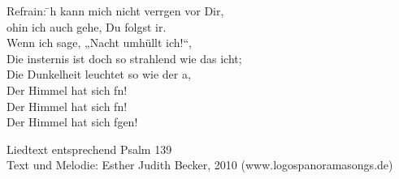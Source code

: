 \begin{tabbing}
Refrain: \=     h kann mich nicht verrgen vor Dir,\\
         \>     ohin ich auch gehe, Du folgst ir.\\
         \>               Wenn ich sage, „Nacht umhüllt ich!“,\\
         \>               Die insternis ist doch so strahlend wie das icht;\\
         \>              Die Dunkelheit leuchtet so wie der a,\\
         \>              Der Himmel hat sich fn!\\
         \>              Der Himmel hat sich fn!\\
         \>              Der Himmel hat sich fgen!\\
\end{tabbing}
\begin{footnotesize}
Liedtext entsprechend Psalm 139\\
Text und Melodie: Esther Judith Becker, 2010 (www.logospanoramasongs.de)
\end{footnotesize}